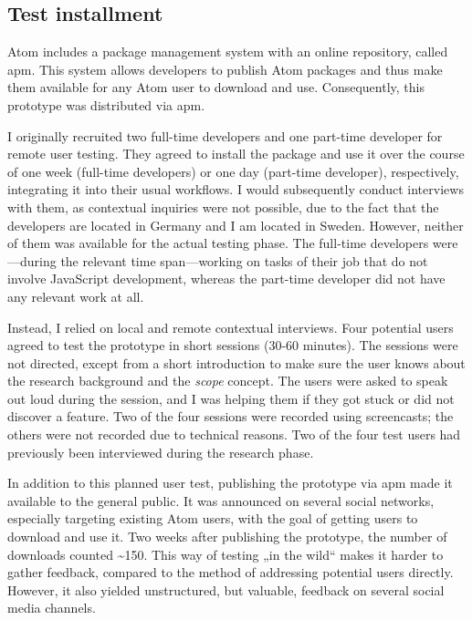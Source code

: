 \subsection{Test installment}\label{test-installment}

Atom includes a package management system with an online repository,
called \ac{apm}. This system allows developers to publish Atom packages
and thus make them available for any Atom user to download and use.
Consequently, this prototype was distributed via \ac{apm}.

I originally recruited two full-time developers and one part-time
developer for remote user testing. They agreed to install the package
and use it over the course of one week (full-time developers) or one day
(part-time developer), respectively, integrating it into their usual
workflows. I would subsequently conduct interviews with them, as
contextual inquiries were not possible, due to the fact that the
developers are located in Germany and I am located in Sweden. However,
neither of them was available for the actual testing phase. The
full-time developers were—during the relevant time span—working on tasks
of their job that do not involve JavaScript development, whereas the
part-time developer did not have any relevant work at all.

Instead, I relied on local and remote contextual interviews. Four
potential users agreed to test the prototype in short sessions (30-60
minutes). The sessions were not directed, except from a short
introduction to make sure the user knows about the research background
and the \emph{scope} concept. The users were asked to speak out loud
during the session, and I was helping them if they got stuck or did not
discover a feature. Two of the four sessions were recorded using
screencasts; the others were not recorded due to technical reasons. Two
of the four test users had previously been interviewed during the
research phase.

In addition to this planned user test, publishing the prototype via
\ac{apm} made it available to the general public. It was announced on
several social networks, especially targeting existing Atom users, with
the goal of getting users to download and use it. Two weeks after
publishing the prototype, the number of downloads counted
\textasciitilde{}150. This way of testing „in the wild“ makes it harder
to gather feedback, compared to the method of addressing potential users
directly. However, it also yielded unstructured, but valuable, feedback
on several social media channels.

